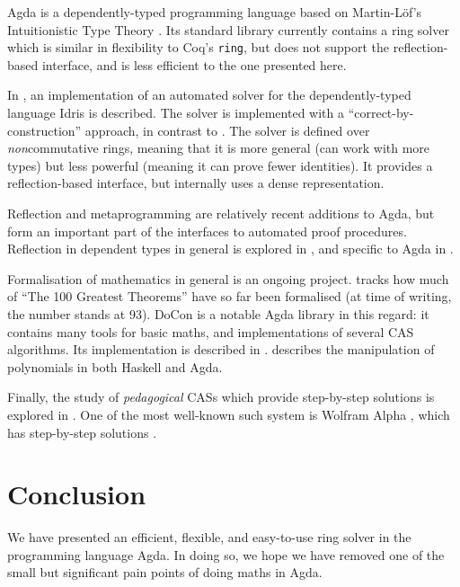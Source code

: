 \documentclass[12pt]{article}
\begin{document}
Agda \cite{norell_dependently_2008} is a dependently-typed programming language
based on Martin-Löf's Intuitionistic Type
Theory \cite{martin-lof_intuitionistic_1980}. Its standard
library \cite{danielsson_agda_2018} currently contains a ring solver which is
similar in flexibility to Coq's \verb+ring+, but does not support the
reflection-based interface, and is less efficient to the one presented here. 

In \cite{geuvers_automatically_2017}, an implementation of an automated solver
for the dependently-typed language Idris \cite{brady_idris_2013} is described.
The solver is implemented with a ``correct-by-construction'' approach, in
contrast to \cite{gregoire_proving_2005}. The solver is defined over
\emph{non}commutative rings, meaning that it is more general (can work with more
types) but less powerful (meaning it can prove fewer identities). It provides a
reflection-based interface, but internally uses a dense representation.

Reflection and metaprogramming are relatively recent additions to Agda, but form
an important part of the interfaces to automated proof procedures. Reflection in
dependent types in general is explored in \cite{christiansen_practical_2015},
and specific to Agda in \cite{van_der_walt_reflection_2012}.

Formalisation of mathematics in general is an ongoing project.
\cite{wiedijk_formalizing_2018} tracks how much of ``The 100 Greatest Theorems''
\cite{kahl_hundred_2004} have so far been formalised (at time of writing, the
number stands at 93). DoCon \cite{meshveliani_docon-provable_2018} is a notable
Agda library in this regard: it contains many tools for basic maths, and
implementations of several CAS algorithms. Its implementation is described
in \cite{meshveliani_dependent_2013}. \cite{cheng_functional_2018} describes the
manipulation of polynomials in both Haskell and Agda.

Finally, the study of \emph{pedagogical} CASs which provide step-by-step
solutions is explored in \cite{lioubartsev_constructing_2016}. One of the most
well-known such system is Wolfram Alpha
\cite{wolfram_research_inc._wolframalpha_2019}, which has step-by-step solutions
\cite{the_development_team_step-by-step_2009}.

\section{Conclusion}
We have presented an efficient, flexible, and easy-to-use ring solver in the
programming language Agda. In doing so, we hope we have removed one of the small
but significant pain points of doing maths in Agda.



\end{document}

